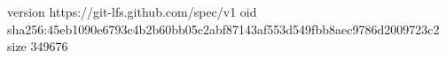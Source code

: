 version https://git-lfs.github.com/spec/v1
oid sha256:45eb1090e6793c4b2b60bb05c2abf87143af553d549fbb8aec9786d2009723c2
size 349676
